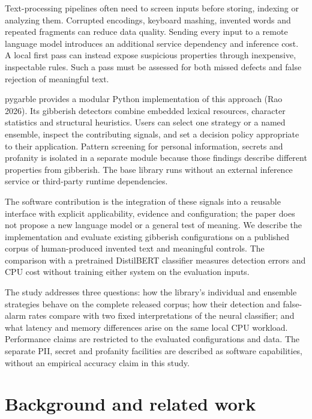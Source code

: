 \documentclass[10pt,a4paper,twocolumn]{article}
\begin{document}
Text-processing pipelines often need to screen inputs before storing,
indexing or analyzing them. Corrupted encodings, keyboard mashing,
invented words and repeated fragments can reduce data quality. Sending
every input to a remote language model introduces an additional service
dependency and inference cost. A local first pass can instead expose
suspicious properties through inexpensive, inspectable rules. Such a
pass must be assessed for both missed defects and false rejection of
meaningful text.

pygarble provides a modular Python implementation of this approach (Rao
2026). Its gibberish detectors combine embedded lexical resources,
character statistics and structural heuristics. Users can select one
strategy or a named ensemble, inspect the contributing signals, and set
a decision policy appropriate to their application. Pattern screening
for personal information, secrets and profanity is isolated in a
separate module because those findings describe different properties
from gibberish. The base library runs without an external inference
service or third-party runtime dependencies.

The software contribution is the integration of these signals into a
reusable interface with explicit applicability, evidence and
configuration; the paper does not propose a new language model or a
general test of meaning. We describe the implementation and evaluate
existing gibberish configurations on a published corpus of
human-produced invented text and meaningful controls. The comparison
with a pretrained DistilBERT classifier measures detection errors and
CPU cost without training either system on the evaluation inputs.

The study addresses three questions: how the library's individual and
ensemble strategies behave on the complete released corpus; how their
detection and false-alarm rates compare with two fixed interpretations
of the neural classifier; and what latency and memory differences arise
on the same local CPU workload. Performance claims are restricted to the
evaluated configurations and data. The separate PII, secret and
profanity facilities are described as software capabilities, without an
empirical accuracy claim in this study.

\section{Background and related work}\label{background-and-related-work}
\end{document}
